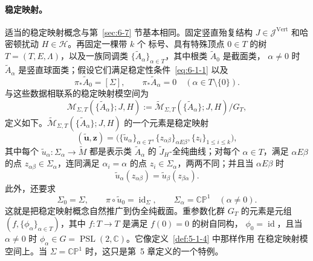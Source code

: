 \paragraph{稳定映射。}
适当的稳定映射概念与第~\ref{sec:6-7} 节基本相同。固定竖直殆复结构
$J\in\mathcal J^{\mathrm{Vert}}$ 和哈密顿扰动 $H\in\mathcal H$。再固定一棵带 $k$ 个
标号、具有特殊顶点 $0\in T$ 的树 $T=(T,E,\Lambda)$，以及一族同调类
$\{\widetilde A_\alpha\}_{\alpha\in T}$，其中根类 $\widetilde A_0$ 是截面类，
$\alpha\ne0$ 时 $\widetilde A_\alpha$ 是竖直球面类；假设它们满足稳定性条件~\eqref{eq:6-1-1} 以及
\begin{equation}\label{eq:8-5-2}
  \pi_*\widetilde A_0=[\Sigma],
  \qquad
  \pi_*\widetilde A_\alpha=0
  \quad(\alpha\in T\setminus\{0\}).
\end{equation}
与这些数据相联系的稳定映射模空间为
\[
  \mathcal M_{\Sigma,T}(\{\widetilde A_\alpha\};J,H)
  :=\widetilde{\mathcal M}_{\Sigma,T}
  (\{\widetilde A_\alpha\};J,H)/G_T,
\]
定义如下。$\widetilde{\mathcal M}_{\Sigma,T}
(\{\widetilde A_\alpha\};J,H)$ 的一个元素是稳定映射
\[
  (\widetilde{\mathbf u},\mathbf z)
  =\bigl(\{\widetilde u_\alpha\}_{\alpha\in T},
    \{z_{\alpha\beta}\}_{\alpha E\beta},
    \{z_i\}_{1\le i\le k}\bigr),
\]
其中每个 $\widetilde u_\alpha:\Sigma_\alpha\to\widetilde M$ 都是表示类
$\widetilde A_\alpha$ 的 $\widetilde J_H$-全纯曲线；对每个 $\alpha\in T$，满足
$\alpha E\beta$ 的点 $z_{\alpha\beta}\in\Sigma_\alpha$，连同满足
$\alpha_i=\alpha$ 的点 $z_i\in\Sigma_\alpha$，两两不同；并且当 $\alpha E\beta$ 时
\[
  \widetilde u_\alpha(z_{\alpha\beta})
  =\widetilde u_\beta(z_{\beta\alpha}).
\]
此外，还要求
\[
  \Sigma_0=\Sigma,
  \qquad \pi\circ\widetilde u_0=\operatorname{id}_\Sigma,
  \qquad \Sigma_\alpha=\mathbb{CP}^1\quad(\alpha\ne0).
\]
这就是把稳定映射概念自然推广到伪全纯截面。重参数化群 $G_T$ 的元素是元组
$(f,\{\phi_\alpha\}_{\alpha\in T})$，其中 $f:T\to T$ 是满足 $f(0)=0$ 的树自同构，
$\phi_0=\operatorname{id}$，且当 $\alpha\ne0$ 时
$\phi_\alpha\in G=\operatorname{PSL}(2,\mathbb C)$。它像定义~\ref{def:5-1-4} 中那样作用
在稳定映射模空间上。当 $\Sigma=\mathbb{CP}^1$ 时，这只是第~5 章定义的一个特例。

